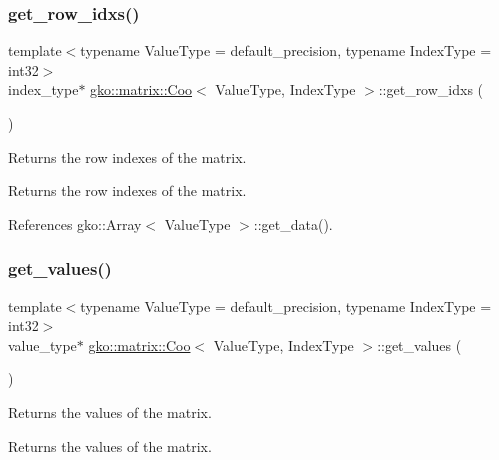 \subsubsection{\texorpdfstring{get\+\_\+row\+\_\+idxs()}{get\_row\_idxs()}}
{\footnotesize\ttfamily template$<$typename Value\+Type = default\+\_\+precision, typename Index\+Type = int32$>$ \\
index\+\_\+type$\ast$ \hyperlink{classgko_1_1matrix_1_1Coo}{gko\+::matrix\+::\+Coo}$<$ Value\+Type, Index\+Type $>$\+::get\+\_\+row\+\_\+idxs (\begin{DoxyParamCaption}{ }\end{DoxyParamCaption})\hspace{0.3cm}{\ttfamily [noexcept]}}



Returns the row indexes of the matrix. 

\begin{DoxyReturn}{Returns}
the row indexes of the matrix. 
\end{DoxyReturn}


References gko\+::\+Array$<$ Value\+Type $>$\+::get\+\_\+data().

\mbox{\label{classgko_1_1matrix_1_1Coo_a1ce59517b8d6a8eeaacfed2b19d4057a}} 
\subsubsection{\texorpdfstring{get\+\_\+values()}{get\_values()}}
{\footnotesize\ttfamily template$<$typename Value\+Type = default\+\_\+precision, typename Index\+Type = int32$>$ \\
value\+\_\+type$\ast$ \hyperlink{classgko_1_1matrix_1_1Coo}{gko\+::matrix\+::\+Coo}$<$ Value\+Type, Index\+Type $>$\+::get\+\_\+values (\begin{DoxyParamCaption}{ }\end{DoxyParamCaption})\hspace{0.3cm}{\ttfamily [noexcept]}}



Returns the values of the matrix. 

\begin{DoxyReturn}{Returns}
the values of the matrix. 
\end{DoxyReturn}


